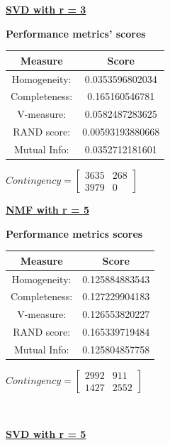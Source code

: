 \documentclass{report}
\begin{document}
\underline{\textbf{SVD with r = 3}} 

\begin{center}
	\textbf{Performance metrics' scores} \\ \vspace{10pt}	
	\begin{tabular}{*{2}{c}}	
		\toprule
		\textbf{Measure} & \textbf{Score} \\ 
		\midrule
		Homogeneity: & 0.0353596802034 \\
		\midrule 
		Completeness: & 0.165160546781 \\
		\midrule
		V-measure: 	& 0.0582487283625 \\
		\midrule
		RAND score: & 0.00593193880668 \\
		\midrule
		Mutual Info: & 0.0352712181601 \\
		\bottomrule
	\end{tabular}
	\qquad
	$Contingency = \left[ \begin{array}{*{2}{c}}
		3635 & 268 \\
		3979 & 0   
        \end{array}\right]
		$
\end{center}
\newpage

\underline{\textbf{NMF with r = 5}} 
\begin{center}
	\textbf{Performance metrics scores} \\ \vspace{10pt}	
	\begin{tabular}{*{2}{c}}
		\toprule
		\textbf{Measure} & \textbf{Score} \\
		\midrule		
		Homogeneity: & 0.125884883543 \\
		\midrule
		Completeness: & 0.127229904183 \\
		\midrule
		V-measure: & 0.126553820227 \\
		\midrule
		RAND score: & 0.165339719484 \\
		\midrule
		Mutual Info: & 0.125804857758 \\
		\bottomrule
	\end{tabular}
	\qquad
	$Contingency = \left[ \begin{array}{*{2}{c}}
		2992  & 911 \\
		1427  & 2552 
		\end{array}\right]
		$
\end{center}
\\ \vspace{20pt}

\underline{\textbf{SVD with r = 5}} 
\end{document}
